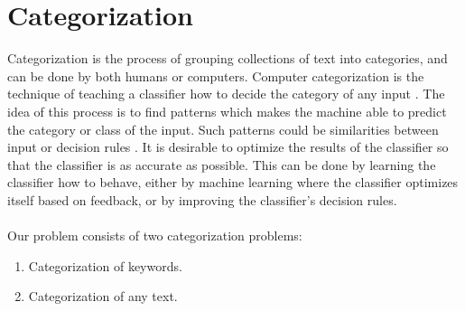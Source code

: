 \section{Categorization}
Categorization is the process of grouping collections of text into categories, and can be done by both humans or computers. Computer categorization is the technique of teaching a classifier how to decide the category of any input \cite{wiki:categorization}. The idea of this process is to find patterns which makes the machine able to predict the category or class of the input. Such patterns could be similarities between input or decision rules \cite{wiki:classification}. It is desirable to optimize the results of the classifier so that the classifier is as accurate as possible. This can be done by learning the classifier how to behave, either by machine learning where the classifier optimizes itself based on feedback, or by improving the classifier's decision rules.  \\\\
Our problem consists of two categorization problems: 
\begin{enumerate}
\item Categorization of keywords.
\item Categorization of any text.
\end{enumerate}

